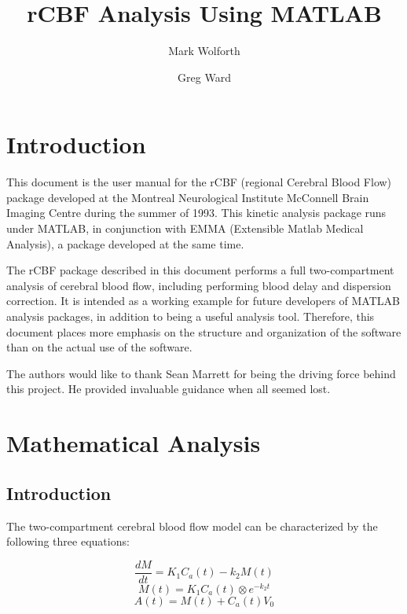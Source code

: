 
\title{rCBF Analysis Using MATLAB}
\author{Mark Wolforth \and Greg Ward}
\psdraft
\def\code#1{{\tt #1}}



\maketitle

\tableofcontents

\newpage
\section{Introduction}

This document is the user manual for the rCBF (regional Cerebral
Blood Flow) package developed at the Montreal Neurological Institute
McConnell Brain Imaging Centre during the summer of 1993.  This
kinetic analysis package runs under MATLAB, in conjunction with EMMA
(Extensible Matlab Medical Analysis), a package developed at the same
time.

The rCBF package described in this document performs a full
two-compartment analysis of cerebral blood flow, including performing
blood delay and dispersion correction.  It is intended as a working
example for future developers of MATLAB analysis packages, in
addition to being a useful analysis tool.  Therefore, this document
places more emphasis on the structure and organization of the
software than on the actual use of the software.

The authors would like to thank Sean Marrett for being the driving
force behind this project.  He provided invaluable guidance when all
seemed lost.

\newpage
\section{Mathematical Analysis}

\subsection{Introduction}

The two-compartment cerebral blood flow model can be characterized by
the following three equations:

\begin{equation}
\frac{dM}{dt} = K_{1}C_{a}(t) - k_{2}M(t)      \label{eq:2comp1}
\end{equation}
\begin{equation}
M(t) = K_{1}C_{a}(t) \otimes e^{-k_{2}t}       \label{eq:2comp2}
\end{equation}
\begin{equation}
A(t) = M(t) + C_{a}(t)V_{0}                    \label{eq:2comp3}
\end{equation}

